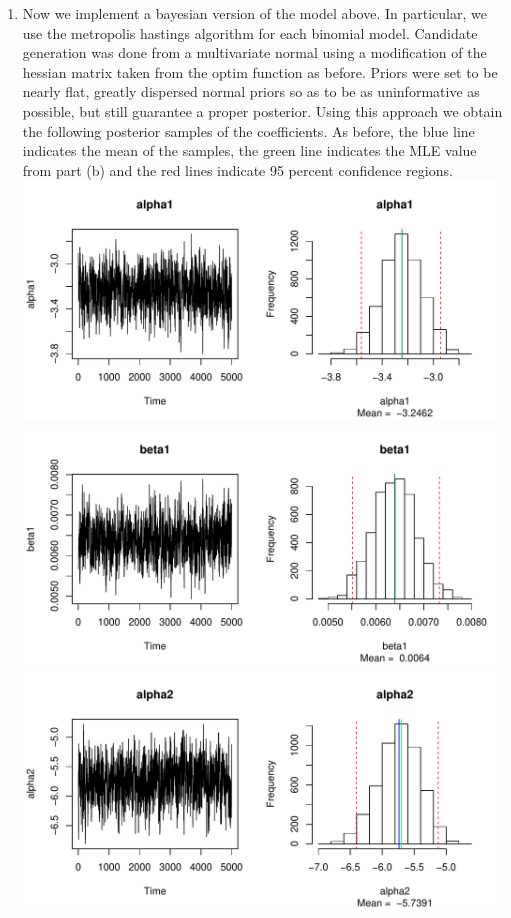 \documentclass[12pt]{article}
\begin{document}
\begin{enumerate}
\begin{enumerate}
	\item Now we implement a bayesian version of the model above. In particular, we use the metropolis hastings algorithm for each binomial model. Candidate generation was done from a multivariate normal using a modification of the hessian matrix taken from the optim function as before. Priors were set to be nearly flat, greatly dispersed normal priors so as to be as uninformative as possible, but still guarantee a proper posterior.  
	 Using this approach we obtain the following posterior samples of the coefficients. As before, the blue line indicates the mean of the samples, the green line indicates the MLE value from part (b) and the red lines indicate 95 percent confidence regions. \\
	\newline
		\includegraphics[scale = .7]{plot14.pdf} \\
	\includegraphics[scale = .7]{plot15.pdf} \\
	\includegraphics[scale = .7]{plot16.pdf} \\

\end{enumerate}
\end{enumerate}
\end{document}
